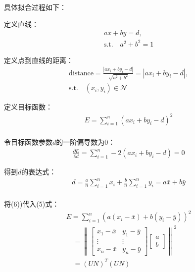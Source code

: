 \documentclass{seuer}
\begin{document}
具体拟合过程如下：

定义直线：
\begin{equation}\label{EQ1}
  \begin{aligned}
  ax+by=d,\\ 
  \text{s.t.} \quad a^2+b^2=1
  \end{aligned}
\end{equation}

定义点到直线的距离：
\begin{equation}\label{EQ1}
  \begin{array}{ll}
  \text{distance}=\frac{|ax_i+by_i-d|}{\sqrt{a^2+b^2}}=|ax_i+by_i-d|,\\ 
  \text{s.t.} \quad (x_i, y_i)\in \mathcal{N}
  \end{array}
\end{equation}

定义目标函数：
\begin{equation}\label{EQ1}
  \begin{aligned}
  E=\sum_{i=1}^{n}(ax_i+by_i-d)^2\\ 
  \end{aligned}
\end{equation}

令目标函数参数$d$的一阶偏导数为0：
\begin{equation}\label{EQ1}
  \begin{aligned}
  \frac{\partial E}{\partial d}=\sum_{i=1}^{n}-2\left(a x_{i}+b y_{i}-d\right)=0
  \end{aligned}
\end{equation}

得到$d$的表达式：
\newpage
\begin{equation}\label{EQ1}
  \begin{aligned}
    d=\frac{a}{n} \sum_{i=1}^{n} x_{i}+\frac{b}{n} \sum_{i=1}^{n} y_{i}=a \bar{x}+b \bar{y}\\
  \end{aligned}
\end{equation}

将(6))代入(5)式：
\begin{equation}\label{EQ1}
  \begin{array}{ll}
    E=\sum_{i=1}^{n}\left(a\left(x_{i}-\bar{x}\right)+b\left(y_{i}-\bar{y}\right)\right)^{2}\\
    \quad=\left\|\left[\begin{array}{cc}
    x_{1}-\bar{x} & y_{1}-\bar{y} \\
\vdots & \vdots \\
x_{n}-\bar{x} & y_{n}-\bar{y}
\end{array}\right]\left[\begin{array}{c}
a \\
b
\end{array}\right]\right\|^{2}\\
\quad=(U N)^{T}(U N) 
  \end{array}
\end{equation}
\end{document}

